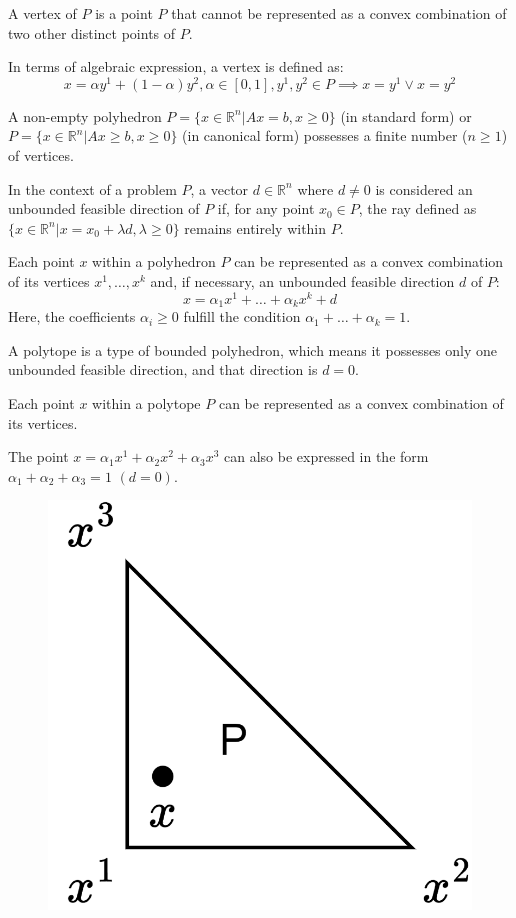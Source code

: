 \begin{definition}
    A vertex of $P$ is a point $P$ that cannot be represented as a convex combination of two other distinct points of $P$. 
\end{definition}
In terms of algebraic expression, a vertex is defined as:
\[x= \alpha y^1+(1-\alpha)y^2, \alpha \in [0,1], y^1,y^2 \in P \implies x=y^1 \lor x=y^2\]
\begin{property}
    A non-empty polyhedron $P=\{x \in \mathbb{R}^n|Ax=b,x \geq 0\}$ (in standard form) or $P=\{x \in \mathbb{R}^n|Ax\geq b,x \geq 0\}$ (in canonical form) possesses a finite number ($n \geq 1$) of vertices. 
\end{property}
\begin{definition}
    In the context of a problem $P$, a vector $d \in \mathbb{R}^n$ where $d \neq 0$ is considered an unbounded feasible direction of $P$ if, for any  point $x_0 \in P$, the ray defined as $\{x \in \mathbb{R}^n|x=x_0+\lambda d,\lambda \geq 0\}$ remains entirely within $P$.
\end{definition}
\begin{theorem}
    Each point $x$ within a polyhedron $P$ can be represented as a convex combination of its vertices $x^1,\dots,x^k$ and, if necessary, an unbounded feasible direction $d$ of $P$: 
    \[x=\alpha_1x^1+\dots+\alpha_kx^k+d\]
    Here, the coefficients $\alpha_i \geq 0$ fulfill the condition $\alpha_1+\dots+\alpha_k=1$. 
\end{theorem}
\begin{definition}
    A polytope is a type of bounded polyhedron, which means it possesses only one unbounded feasible direction, and that direction is $d=0$. 
\end{definition}
Each point $x$ within a polytope $P$ can be represented as a convex combination of its vertices.
\begin{example}
    The point $x=\alpha_1x^1+\alpha_2x^2+\alpha_3x^3$ can also be expressed in the form $\alpha_1+\alpha_2+\alpha_3=1$ $(d=0)$. 
    \begin{figure}[H]
        \centering
        \includegraphics[width=0.2\linewidth]{images/polytope.png}
    \end{figure}
\end{example}
